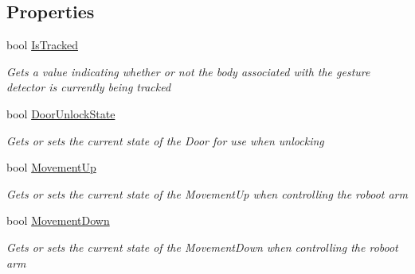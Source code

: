 \subsection*{Properties}
\begin{DoxyCompactItemize}
\item 
bool \hyperlink{class_microsoft_1_1_samples_1_1_kinect_1_1_kinect_security_system_1_1_gesture_result_view_a4cb511dfb3fa23ab53933e4710d8d529}{Is\+Tracked}
\begin{DoxyCompactList}\small\item\em Gets a value indicating whether or not the body associated with the gesture detector is currently being tracked \end{DoxyCompactList}\item 
bool \hyperlink{class_microsoft_1_1_samples_1_1_kinect_1_1_kinect_security_system_1_1_gesture_result_view_abaf9084f0c133249f988a591328aaa71}{Door\+Unlock\+State}
\begin{DoxyCompactList}\small\item\em Gets or sets the current state of the \textquotesingle{}Door\textquotesingle{} for use when unlocking \end{DoxyCompactList}\item 
bool \hyperlink{class_microsoft_1_1_samples_1_1_kinect_1_1_kinect_security_system_1_1_gesture_result_view_a2009481106fc07209eeead77913cde6f}{Movement\+Up}
\begin{DoxyCompactList}\small\item\em Gets or sets the current state of the \textquotesingle{}Movement\+Up\textquotesingle{} when controlling the roboot arm \end{DoxyCompactList}\item 
bool \hyperlink{class_microsoft_1_1_samples_1_1_kinect_1_1_kinect_security_system_1_1_gesture_result_view_ac21ef19452f6b54a80fe547719fd7230}{Movement\+Down}
\begin{DoxyCompactList}\small\item\em Gets or sets the current state of the \textquotesingle{}Movement\+Down\textquotesingle{} when controlling the roboot arm \end{DoxyCompactList}\item 

\end{DoxyCompactItemize}
